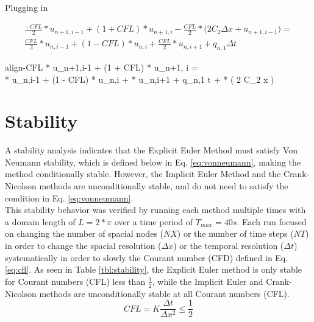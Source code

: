 \documentclass[10pt, letter, showtrims]{extarticle}
\newcommand{\boxedeq}[2]{\begin{empheq}[box={\fboxsep=6pt\fbox}]{align}\label{#1}#2\end{empheq}}
\begin{document}
    		\noindent
    		Plugging in
    		
    		\begin{equation}
    			\begin{split}
    			\frac{-CFL}{2} * u_{n+1,i-1} + (1 + CFL) * u_{n+1, i} - \frac{CFL}{2} * \big( 2 C_{2} \Delta x + u_{n+1,i-1} \big) = \\ 
    			\frac{CFL}{2} * u_{n,i-1} + (1 - CFL) * u_{n,i} + \frac{CFL}{2} * u_{n,i+1} + q_{n,1} \Delta t
    			\end{split}
    		\end{equation}
    		
    		\boxedeq{}{-CFL * u_{n+1,i-1} + (1 + CFL) * u_{n+1, i} = \\ 
    			\frac{CFL}{2} * u_{n,i-1} + (1 - CFL) * u_{n,i} + \frac{CFL}{2} * u_{n,i+1} + q_{n,1} \Delta t + \frac{CFL}{2} * \big( 2 C_{2} \Delta x \big)}
    		
		\pagebreak
		
		\section{Stability}
		
		\noindent
		A stability analysis indicates that the Explicit Euler Method must satisfy Von Neumann stability, which is defined below in Eq. \ref{eq:vonneumann}, making the method conditionally stable. However, the Implicit Euler Method and the Crank-Nicolson methods are unconditionally stable, and do not need to satisfy the condition in Eq. \ref{eq:vonneumann}. \\
		
		\noindent
		This stability behavior was verified by running each method multiple times with a domain length of $L = 2*\pi$ over a time period of $T_{max} = 40 s$. Each run focused on changing the number of spacial nodes ($NX$) or the number of time steps ($NT$) in order to change the spacial resolution ($\Delta x$) or the temporal resolution ($\Delta t$) systematically in order to slowly the Courant number (CFD) defined in Eq. \ref{eq:cfl}. As seen in Table \ref{tbl:stability}, the Explicit Euler method is only stable for Courant numbers (CFL) less than $\frac{1}{2}$, while the Implicit Euler and Crank-Nicolson methods are unconditionally stable at all Courant numbers (CFL).\\
		

		
		\begin{equation}
		\label{eq:vonneumann}
			CFL = K\frac{\Delta t}{\Delta x^{2}} \leq \frac{1}{2}
		\end{equation}	
\end{document}
